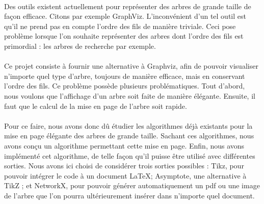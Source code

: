 \paragraph{}Des outils existent actuellement pour représenter des arbres de grande taille de façon efficace. Citons par exemple GraphViz. L'inconvénient d'un tel outil est qu'il ne prend pas en compte l'ordre des fils de manière triviale. Ceci pose problème lorsque l'on souhaite représenter des arbres dont l'ordre des fils est primordial : les arbres de recherche par exemple.
\paragraph{}Ce projet consiste à fournir une alternative à Graphviz, afin de pouvoir visualiser n'importe quel type d'arbre, toujours de manière efficace, mais en conservant l'ordre des fils. Ce problème possède plusieurs problématiques. Tout d'abord, nous voulons que l'affichage d'un arbre soit faite de manière élégante. Ensuite, il faut que le calcul de la mise en page de l'arbre soit rapide.
\paragraph{}Pour ce faire, nous avons donc dû étudier les algorithmes déjà existants pour la mise en page élégante des arbres de grande taille. Sachant ces algorithmes, nous avons conçu un algorithme permettant cette mise en page. Enfin, nous avons implémenté cet algorithme, de telle façon qu'il puisse être utilisé avec différentes sorties. Nous avons ici choisi de considérer trois sorties possibles : Tikz, pour pouvoir intégrer le code à un document \LaTeX ; Asymptote, une alternative à TikZ ; et NetworkX, pour pouvoir générer automatiquement un pdf ou une image de l'arbre que l'on pourra ultérieurement insérer dans n'importe quel document.
